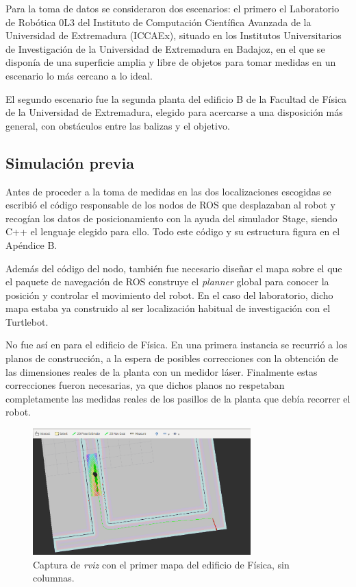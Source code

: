 Para la toma de datos se consideraron dos escenarios: el primero el Laboratorio de Robótica 0L3 del Instituto de Computación Científica Avanzada de la Universidad de Extremadura (ICCAEx), situado en los Institutos Universitarios de Investigación de la Universidad de Extremadura en Badajoz, en el que se disponía de una superficie amplia y libre de objetos para tomar medidas en un escenario lo más cercano a lo ideal.

El segundo escenario fue la segunda planta del edificio B de la Facultad de Física de la Universidad de Extremadura, elegido para acercarse a una disposición más general, con obstáculos entre las balizas y el objetivo.

\subsection{Simulación previa}

Antes de proceder a la toma de medidas en las dos localizaciones escogidas se escribió el código responsable de los nodos de ROS que desplazaban al robot y recogían los datos de posicionamiento con la ayuda del simulador Stage, siendo C++ el lenguaje elegido para ello.
Todo este código y su estructura figura en el Apéndice B.

Además del código del nodo, también fue necesario diseñar el mapa sobre el que el paquete de navegación de ROS construye el \textit{planner} global para conocer la posición y controlar el movimiento del robot.
En el caso del laboratorio, dicho mapa estaba ya construido al ser localización habitual de investigación con el Turtlebot.

No fue así en para el edificio de Física.
En una primera instancia se recurrió a los planos de construcción, a la espera de posibles correcciones con la obtención de las dimensiones reales de la planta con un medidor láser.
Finalmente estas correcciones fueron necesarias, ya que dichos planos no respetaban completamente las medidas reales de los pasillos de la planta que debía recorrer el robot.

\begin{figure}[H]
  \centering
  \includegraphics[width=0.75\textwidth]{pic/Trayectoria.png}
  \caption{Captura de \textit{rviz} con el primer mapa del edificio de Física, sin columnas.}
  \label{fig:plano_fisica}
\end{figure}

